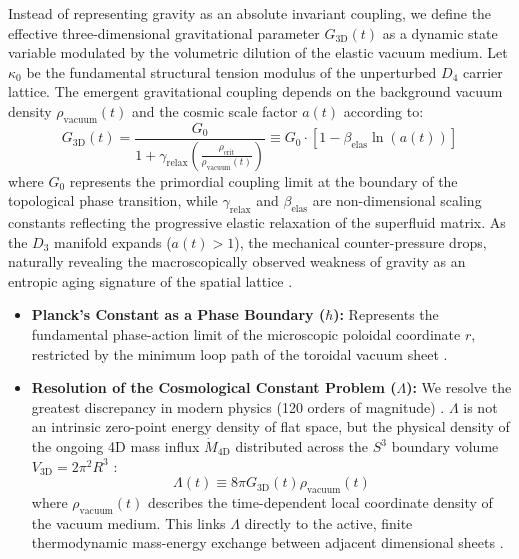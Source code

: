 \documentclass[twocolumn]{aa}
\begin{document}
Instead of representing gravity as an absolute invariant coupling, we define the effective three-dimensional gravitational parameter $G_{\text{3D}}(t)$ as a dynamic state variable modulated by the volumetric dilution of the elastic vacuum medium. Let $\kappa_0$ be the fundamental structural tension modulus of the unperturbed $D_4$ carrier lattice. The emergent gravitational coupling depends on the background vacuum density $\rho_{\text{vacuum}}(t)$ and the cosmic scale factor $a(t)$ according to:
\begin{equation}
G_{\text{3D}}(t) = \frac{G_0}{1 + \gamma_{\text{relax}} \left(\frac{\rho_{\text{crit}}}{\rho_{\text{vacuum}}(t)}\right)} \equiv G_0 \cdot \left[ 1 - \beta_{\text{elas}} \ln\left(a(t)\right) \right]
\end{equation}
where $G_0$ represents the primordial coupling limit at the boundary of the topological phase transition, while $\gamma_{\text{relax}}$ and $\beta_{\text{elas}}$ are non-dimensional scaling constants reflecting the progressive elastic relaxation of the superfluid matrix. As the $D_3$ manifold expands ($a(t) > 1$), the mechanical counter-pressure drops, naturally revealing the macroscopically observed weakness of gravity as an entropic aging signature of the spatial lattice \cite{verlinde2011}.

\begin{itemize}
    \item \textbf{Planck's Constant as a Phase Boundary ($\hbar$):} Represents the fundamental phase-action limit of the microscopic poloidal coordinate $r$, restricted by the minimum loop path of the toroidal vacuum sheet \cite{volovik2003}.
    \item \textbf{Resolution of the Cosmological Constant Problem ($\Lambda$):} We resolve the greatest discrepancy in modern physics (120 orders of magnitude) \cite{verlinde2011}. $\Lambda$ is not an intrinsic zero-point energy density of flat space, but the physical density of the ongoing 4D mass influx $\dot{M}_{\text{4D}}$ distributed across the $S^3$ boundary volume $V_{\text{3D}} = 2\pi^2 R^3$ \cite{verlinde2011}:
    \begin{equation}
    \Lambda(t) \equiv 8\pi G_{\text{3D}}(t) \rho_{\text{vacuum}}(t)
    \end{equation}
    where $\rho_{\text{vacuum}}(t)$ describes the time-dependent local coordinate density of the vacuum medium. This links $\Lambda$ directly to the active, finite thermodynamic mass-energy exchange between adjacent dimensional sheets \cite{verlinde2011}.
\end{itemize}
\vspace{1em}
\end{document}

